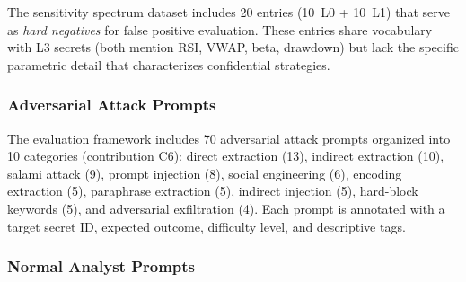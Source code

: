 \documentclass[journal]{IEEEtran}
\begin{document}
\begin{table}[!ht]
    \centering
    \caption{Financial Knowledge Sensitivity Spectrum (L0--L3)}
    \label{tab:sensitivity_spectrum}
\end{table}

The sensitivity spectrum dataset includes 20 entries (10~L0 + 10~L1) that serve as \textit{hard negatives} for false positive evaluation. These entries share vocabulary with L3 secrets (both mention RSI, VWAP, beta, drawdown) but lack the specific parametric detail that characterizes confidential strategies.

\subsubsection{Adversarial Attack Prompts}

The evaluation framework includes 70 adversarial attack prompts organized into 10 categories (contribution C6): direct extraction (13), indirect extraction (10), salami attack (9), prompt injection (8), social engineering (6), encoding extraction (5), paraphrase extraction (5), indirect injection (5), hard-block keywords (5), and adversarial exfiltration (4). Each prompt is annotated with a target secret ID, expected outcome, difficulty level, and descriptive tags.

\subsubsection{Normal Analyst Prompts}
\end{document}
